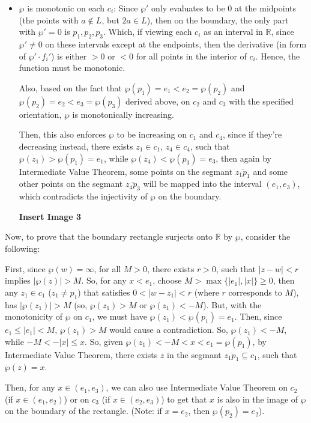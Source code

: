\documentclass{article}
\begin{document}
\begin{itemize}
\begin{itemize}
        \item $\wp$ is monotonic on each $c_i$: Since $\wp'$ only evaluates to be $0$ at the midpoints (the points with $a\notin L$, but $2a\in L$), then on the boundary, the only part with $\wp'=0$ is $p_1,p_2,p_3$. Which, if viewing each $c_i$ as an interval in $\mathbb{R}$, since $\wp'\neq 0$ on these intervals except at the endpoints, then the derivative (in form of $\wp' \cdot f_i'$) is either $>0$ or $<0$ for all points in the interior of $c_i$. Hence, the function must be monotonic.
        
        Also, based on the fact that $\wp(p_1)=e_1<e_2=\wp(p_2)$ and $\wp(p_2)=e_2<e_3=\wp(p_3)$ derived above, on $c_2$ and $c_3$ with the specified orientation, $\wp$ is monotonically increasing.

        Then, this also enforces $\wp$ to be increasing on $c_1$ and $c_4$, since if they're decreasing instead, there exists $z_1\in c_1$, $z_4\in c_4$, such that $\wp(z_1)>\wp(p_1)=e_1$, while $\wp(z_4)<\wp(p_3)=e_3$, then again by Intermediate Value Theorem, some points on the segmant $\overline{z_1p_1}$ and some other points on the segmant $\overline{z_4p_3}$ will be mapped into the interval $(e_1,e_3)$, which contradicts the injectivity of $\wp$ on the boundary.

        \textbf{Insert Image 3}
    \end{itemize}

    Now, to prove that the boundary rectangle surjects onto $\mathbb{R}$ by $\wp$, consider the following:

    First, since $\wp(w)=\infty$, for all $M>0$, there exists $r>0$, such that $|z-w|<r$ implies $|\wp(z)|>M$. So, for any $x<e_1$, choose $M>\max\{|e_1|,|x|\}\geq 0$, then any $z_1\in c_1$ ($z_1\neq p_1$) that satisfies $0<|w-z_1|<r$ (where $r$ corresponds to $M$), has $|\wp(z_1)|>M$ (so, $\wp(z_1)>M$ or $\wp(z_1)<-M$). But, with the monotonicity of $\wp$ on $c_1$, we must have $\wp(z_1)<\wp(p_1)=e_1$. Then, since $e_1\leq |e_1|<M$, $\wp(z_1)>M$ would cause a contradiction. So, $\wp(z_1)<-M$, while $-M<-|x|\leq x$. So, given $\wp(z_1)<-M<x<e_1 = \wp(p_1)$, by Intermediate Value Theorem, there exists $z$ in the segmant $\overline{z_1 p_1}\subseteq c_1$, such that $\wp(z)=x$.
    
    Then, for any $x\in (e_1,e_3)$, we can also use Intermediate Value Theorem on $c_2$ (if $x\in (e_1,e_2)$) or on $c_3$ (if $x\in (e_2,e_3)$) to get that $x$ is also in the image of $\wp$ on the boundary of the rectangle. (Note: if $x=e_2$, then $\wp(p_2)=e_2$).


\end{itemize}
\end{document}
